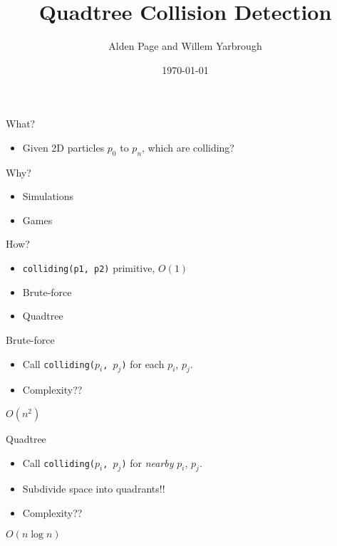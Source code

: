 \documentclass{beamer}
\title{\huge Quadtree Collision Detection}
\author[Page and Yarbrough]{Alden Page and Willem Yarbrough}
\institute[Allegheny College]{Department of Computer Science \\ Allegheny College}
\date{\today}
\begin{document}
\begin{frame}
  \titlepage
\end{frame}

\begin{frame}
    \huge{What?}\normalsize
    \begin{itemize}
      \item Given 2D particles $p_0$ to $p_n$, which are colliding?
    \end{itemize} \vspace{0.5cm} \pause
    \huge{Why?}\normalsize
    \begin{itemize}
      \item Simulations
      \item Games
    \end{itemize} \vspace{0.5cm} \pause
    \huge{How?}\normalsize
    \begin{itemize}
      \item \texttt{colliding(p1, p2)} primitive, $O(1)$
      \item Brute-force
      \item Quadtree
    \end{itemize}
\end{frame}

\begin{frame}
    \huge{Brute-force}\normalsize
    \begin{itemize}
      \item Call \texttt{colliding($p_i$, $p_j$)} for each $p_i$, $p_j$.
      \item Complexity??
    \end{itemize}
    \pause
    \vspace{0.5cm}
    \begin{center}
      \huge{$O(n^2)$}\normalsize
    \end{center}
\end{frame}

\begin{frame}
    \huge{Quadtree}\normalsize
    \begin{itemize}
      \item Call \texttt{colliding($p_i$, $p_j$)} for \textit{nearby} $p_i$, $p_j$.
      \item Subdivide space into quadrants!!
      \item Complexity??
    \end{itemize}
    \pause
    \vspace{0.5cm}
    \begin{center}
      \huge{$O(n \log n)$}\normalsize
    \end{center}
\end{frame}
\end{document}
